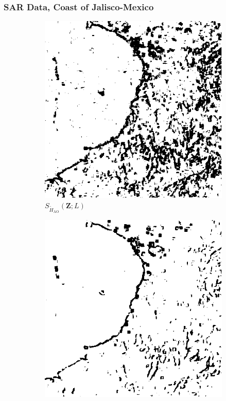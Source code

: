 \documentclass[aspectratio=1610,10pt]{beamer}
\begin{document}
\begin{frame} \frametitle{\large{SAR Data, Coast of Jalisco-Mexico }}\vspace{-0.1cm}
\begin{figure}[H]
  \centering
  \begin{subfigure}[b]{0.3\textwidth}
    \centering
    \includegraphics[width=\textwidth]{../../Figures/PNG/H_005__Mexico_512_18L_AO_200b}
    \caption{$S_{\widetilde{H}_{\text{AO}}}(\bm{Z}; L)$}
    \label{fig:Mexico_crops_0.05-1}
  \end{subfigure}
  \hfill
  \begin{subfigure}[b]{0.3\textwidth}
    \centering
    \includegraphics[width=\textwidth]{../../Figures/PNG/cv_005_pvalues_mexico_512}

\end{subfigure}
\end{figure}
\end{frame}
\end{document}
